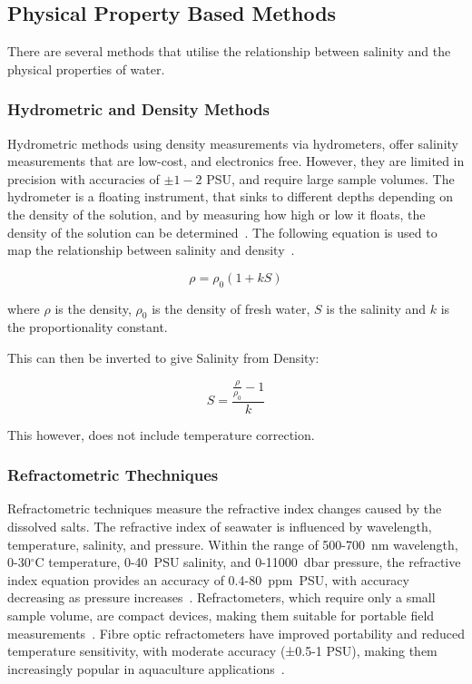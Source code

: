 \subsection{Physical Property Based Methods}
There are several methods that utilise the relationship between salinity and the physical properties of water.

\subsubsection{Hydrometric and Density Methods}
Hydrometric methods using density measurements via hydrometers, offer salinity measurements that are low-cost, and electronics free. 
However, they are limited in precision with accuracies of $\pm 1-2$ PSU, and require large sample volumes.
The hydrometer is a floating instrument, that sinks to different depths depending on the density of the solution, and by measuring how high or low it floats, the density of the solution can be determined~\cite{the_globe_program_hydrometer}.
The following equation is used to map the relationship between salinity and density~\cite{kjerfve_density}.

\begin{equation}
    \rho = \rho_0(1+kS)
\end{equation}

where $\rho$ is the density, $\rho_0$ is the density of fresh water, $S$ is the salinity and $k$ is the proportionality constant. 

This can then be inverted to give Salinity from Density:

\begin{equation}
S = \frac{\frac{\rho}{\rho_0}-1}{k}
\end{equation}

This however, does not include temperature correction.

\subsubsection{Refractometric Thechniques}
Refractometric techniques measure the refractive index changes caused by the dissolved salts.
The refractive index of seawater is influenced by wavelength, temperature, salinity, and pressure. 
Within the range of 500-700~nm wavelength, 0-30$^\circ$C temperature, 0-40~PSU salinity, and 0-11000~dbar pressure, the refractive index equation provides an accuracy of 0.4-80~ppm~PSU, with accuracy decreasing as pressure increases~\cite{refraction_millard}.
Refractometers, which require only a small sample volume, are compact devices, making them suitable for portable field measurements~\cite{malarde_high-resolution_refractometer}.
Fibre optic refractometers have improved portability and reduced temperature sensitivity, with moderate accuracy (±0.5-1 PSU), making them increasingly popular in aquaculture applications~\cite{zhang_high-temperature_fibre}. 


